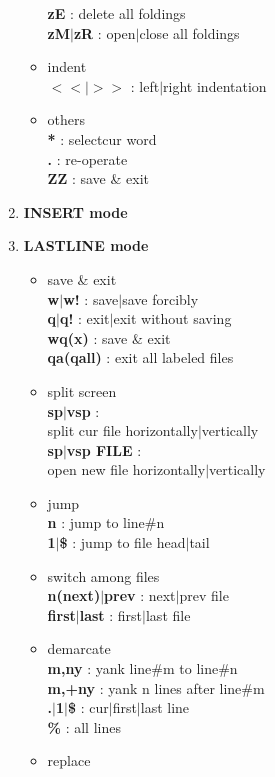 \documentclass[10pt, a4paper]{article}
\begin{document}
\begin{enumerate}
\begin{itemize}
    \textbf{zE} : delete all foldings \\
    \textbf{zM{$|$}zR} : open{$|$}close all foldings
    \item indent \\
    \textbf{$<<${$|$}$>>$} : left{$|$}right indentation
    \item others \\
    \textbf{*} : selectcur word \\
    \textbf{.} : re-operate \\
    \textbf{ZZ} : save \& exit
    \end{itemize}
\item{\textbf{INSERT mode}}
\item{\textbf{LASTLINE mode}}
    \begin{itemize}
    \item save \& exit \\
    \textbf{w{$|$}w!} : save{$|$}save forcibly \\
    \textbf{q{$|$}q!} : exit{$|$}exit without saving \\ 
    \textbf{wq(x)} : save \& exit \\
    \textbf{qa(qall)} : exit all labeled files
    \item split screen \\
    \textbf{sp{$|$}vsp} : \\ split cur file horizontally{$|$}vertically \\
    \textbf{sp{$|$}vsp FILE} : \\ open new file horizontally{$|$}vertically
    \item jump \\
    \textbf{n} : jump to line\#n \\
    \textbf{1{$|$}\$} : jump to file head{$|$}tail
    \item switch among files \\
    \textbf{n(next){$|$}prev} : next{$|$}prev file \\
    \textbf{first{$|$}last} : first{$|$}last file
    \item demarcate \\
    \textbf{m,ny} : yank line\#m to line\#n \\
    \textbf{m,+ny} : yank n lines after line\#m \\  
    \textbf{.{$|$}1{$|$}\$} : cur{$|$}first{$|$}last line \\
    \textbf{\%} : all lines 
    \item replace \\

\end{itemize}
\end{enumerate}
\end{document}
